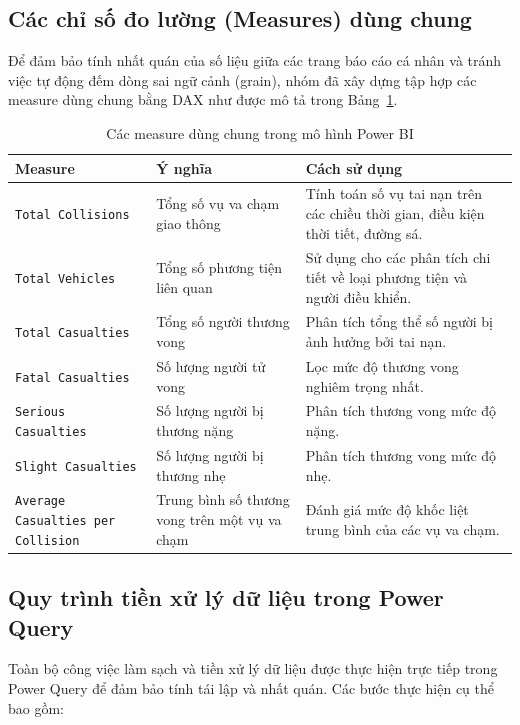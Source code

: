 \subsection{Các chỉ số đo lường (Measures) dùng chung}

Để đảm bảo tính nhất quán của số liệu giữa các trang báo cáo cá nhân và tránh việc tự động đếm dòng sai ngữ cảnh (grain), nhóm đã xây dựng tập hợp các measure dùng chung bằng DAX như được mô tả trong Bảng~\ref{tab:measures}.

\begin{table}[H]
\centering
\begin{tabular}{|p{3.8cm}|p{5.2cm}|p{5.2cm}|}
\hline
\textbf{Measure} & \textbf{Ý nghĩa} & \textbf{Cách sử dụng} \\ \hline
\texttt{Total Collisions} & Tổng số vụ va chạm giao thông & Tính toán số vụ tai nạn trên các chiều thời gian, điều kiện thời tiết, đường sá. \\ \hline
\texttt{Total Vehicles} & Tổng số phương tiện liên quan & Sử dụng cho các phân tích chi tiết về loại phương tiện và người điều khiển. \\ \hline
\texttt{Total Casualties} & Tổng số người thương vong & Phân tích tổng thể số người bị ảnh hưởng bởi tai nạn. \\ \hline
\texttt{Fatal Casualties} & Số lượng người tử vong & Lọc mức độ thương vong nghiêm trọng nhất. \\ \hline
\texttt{Serious Casualties} & Số lượng người bị thương nặng & Phân tích thương vong mức độ nặng. \\ \hline
\texttt{Slight Casualties} & Số lượng người bị thương nhẹ & Phân tích thương vong mức độ nhẹ. \\ \hline
\texttt{Average Casualties per Collision} & Trung bình số thương vong trên một vụ va chạm & Đánh giá mức độ khốc liệt trung bình của các vụ va chạm. \\ \hline
\end{tabular}
\caption{Các measure dùng chung trong mô hình Power BI}
\label{tab:measures}
\end{table}

\subsection{Quy trình tiền xử lý dữ liệu trong Power Query}

Toàn bộ công việc làm sạch và tiền xử lý dữ liệu được thực hiện trực tiếp trong Power Query để đảm bảo tính tái lập và nhất quán. Các bước thực hiện cụ thể bao gồm:

